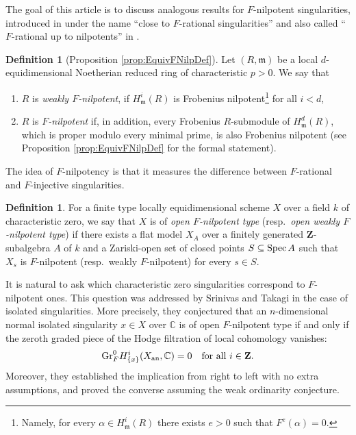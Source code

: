 \documentclass[letterpaper,11pt]{amsart}
\theoremstyle{plain}
\theoremstyle{definition}
\newtheorem{defi}[thm]{Definition}
\theoremstyle{remark}
\def\Z{{\mathbf Z}}
\def\frm{\mathfrak{m}}
\def\m{\mathfrak{m}} %
\begin{document}
The goal of this article is to discuss analogous results for $F$-nilpotent singularities, introduced in \cite{BB05} under the name ``close to $F$-rational singularities'' and also called ``$F$-rational up to nilpotents'' in \cite{BBLSZ}. 
\begin{defi}[{Proposition \ref{prop:EquivFNilpDef}}]
\label{defi:FnilpIntro} Let $(R,\frm)$ be a local $d$-equidimensional Noetherian reduced ring of characteristic $p>0$. We say that 
\begin{enumerate}
    \item $R$ is \emph{weakly $F$-nilpotent}, if  $H^i_\frm(R)$ is Frobenius nilpotent\footnote{Namely, for every $\alpha \in H^i_\m(R)$ there exists $e>0$ such that $F^e(\alpha)=0.$} for all $i < d$, 
    \item $R$ is \emph{$F$-nilpotent} if, in addition, every Frobenius $R$-submodule of $H^{d}_{\frm}(R)$, which is proper modulo every minimal prime, is also Frobenius nilpotent (see Proposition \ref{prop:EquivFNilpDef} for the formal statement).
\end{enumerate}

\end{defi}
The idea of $F$-nilpotency is that it measures the difference between $F$-rational and $F$-injective singularities.
\begin{defi} \label{defi:introDenseOpen}
 For a finite type locally equidimensional scheme $X$ over a field $k$ of characteristic zero, we say that $X$ is of \emph{open $F$-nilpotent type} (resp.\ \emph{open weakly $F$-nilpotent type}) if there exists a flat model $X_A$ over a finitely generated $\Z$-subalgebra $A$ of $k$ and a Zariski-open set of closed points $S \subseteq {\rm Spec}\, A$ such that $X_s$ is $F$-nilpotent (resp.\ weakly $F$-nilpotent) for every $s \in S$.
\end{defi}

It is natural to ask which characteristic zero singularities correspond to $F$-nilpotent ones. This question was addressed by Srinivas and Takagi \cite{Srinivas-Takagi} in the case of isolated singularities. More precisely, they conjectured that an $n$-dimensional normal isolated singularity $x \in X$ over $\mathbb{C}$ is of open $F$-nilpotent type if and only if  the zeroth graded piece of the Hodge filtration of local cohomology vanishes:
\[
{\rm Gr}^0_F H^i_{\{x\}}(X_{\rm an}, \mathbb{C}) = 0 \quad \text{for all } i \in \Z.
\]
Moreover, they established the implication from right to left with no extra assumptions, and proved the converse assuming the weak ordinarity conjecture. 
\end{document}
